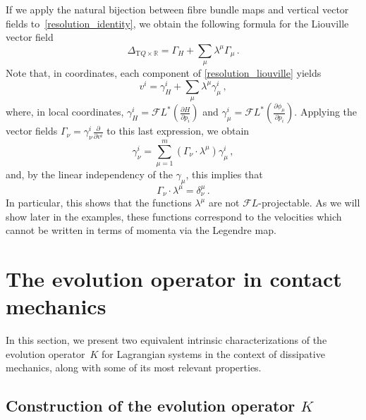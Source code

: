 \documentclass[11pt]{article}
\theoremstyle{plain}
\theoremstyle{definition}
\newcommand{\R}{\mathbb{R}}
\newcommand{\T}{{\mathrm T}}
\let\Tan\T
\newcommand{\F}{\mathcal{F}}
\newcommand{\parder}[2]{\frac{\partial #1}{\partial #2}}
\def\Tan{\mathrm{T}}
\def\FL{\mathcal{F} L}
\begin{document}
If we apply the natural bijection between fibre bundle maps and vertical vector fields to~\eqref{resolution_identity}, we obtain the following formula for the Liouville vector field
\begin{equation}\label{resolution_liouville}
    \Delta_{\Tan Q \times \R} = \Gamma_H + \sum_{\mu} \lambda^\mu \Gamma_{\mu}\,.
\end{equation}
Note that, in coordinates, each component of \eqref{resolution_liouville} yields
$$v^i = \gamma_H ^i + \sum_{\mu}\lambda^\mu \gamma_{{\mu}}^i\,,$$
where, in local coordinates, $\gamma_H^i =\FL^*\left(\parder{H}{p_i}\right) $ and  $\gamma_{\mu}^i = \FL^*\left(\parder{\phi_\mu}{p_i}\right)$.
Applying the vector fields $\Gamma_{\nu} = \gamma_{\nu}^i \parder{}{v^i}$ to this last expression, we obtain
$$\gamma_{\nu}^i = \sum_{\mu=1}^{m} (\Gamma_{\nu}\cdot\lambda^{\mu})\gamma_{\mu}^i\,,$$
and, by the linear independency of the $\gamma_{\mu}$, this implies that
\begin{equation} \label{Gamma_vf_condition}
	\Gamma_{\nu} \cdot \lambda^{\mu} = \delta_{\nu}^{\mu}   \,.
\end{equation}
In particular, this shows that the functions $\lambda^
\mu$ are not $\F L$-projectable. As we will show later in the examples, these functions correspond to the velocities which cannot be written in terms of momenta via the Legendre map.



\section{The evolution operator in contact mechanics}
\label{sec:contact_K_operator}

In this section, we present two equivalent intrinsic characterizations of the evolution operator~$K$ for Lagrangian systems in the context of dissipative mechanics, along with some of its most relevant properties.


\subsection{Construction of the evolution operator \texorpdfstring{$K$}{}}
\end{document}
